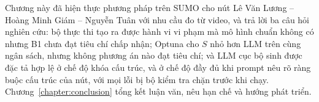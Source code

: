 \documentclass[../main.tex]{subfiles}
\begin{document}
\medskip

Chương này đã hiện thực phương pháp trên SUMO cho nút Lê Văn Lương -- Hoàng Minh Giám -- Nguyễn Tuân với nhu cầu đo từ video, và trả lời ba câu hỏi nghiên cứu: bộ thực thi tạo ra được hành vi vi phạm mà mô hình chuẩn không có nhưng B1 chưa đạt tiêu chí chấp nhận; Optuna cho $S$ nhỏ hơn LLM trên cùng ngân sách, nhưng không phương án nào đạt tiêu chí; và LLM cục bộ sinh được đặc tả hợp lệ ở chế độ khóa cấu trúc, và ở chế độ đầy đủ khi prompt nêu rõ ràng buộc cấu trúc của nút, với mọi lỗi bị bộ kiểm tra chặn trước khi chạy. Chương~\ref{chapter:conclusion} tổng kết luận văn, nêu hạn chế và hướng phát triển.
\end{document}
